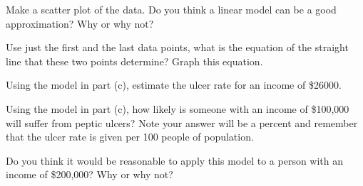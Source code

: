 \begin{activity}
\item Make a scatter plot of the data.  Do you think a linear model can be a good
    approximation?  Why or why not?

\item Use just the first and the last data points, what is the equation of the straight
    line that these two points determine?  Graph this equation.

\item Using the model in part (c), estimate the ulcer rate for an income of \$26000.

\item Using the model in part (c), how likely is someone with an income of \$100,000 will
    suffer from peptic ulcers?  Note your answer will be a percent and remember that the
    ulcer rate is given per 100 people of population.

\item Do you think it would be reasonable to apply this model to a person with an income
    of \$200,000?  Why or why not?
\ea
\end{activity}\aftera
